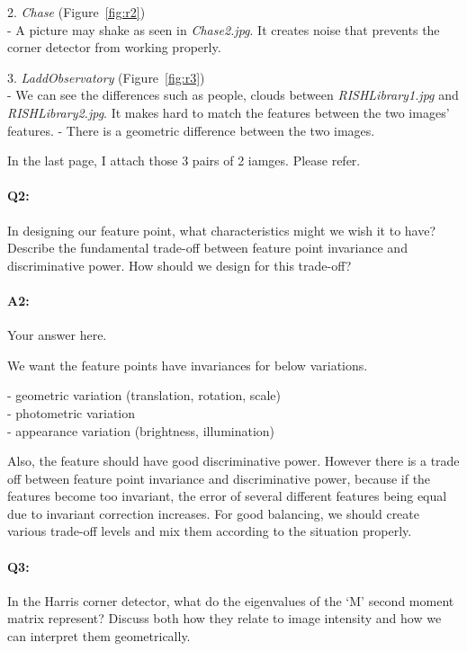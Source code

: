 2. \emph{Chase} (Figure~\ref{fig:r2}) \\
- A picture may shake as seen in \emph{Chase2.jpg}. It creates noise that prevents the corner detector from working properly.


3. \emph{LaddObservatory} (Figure~\ref{fig:r3})\\
- We can see the differences such as people, clouds between \emph{RISHLibrary1.jpg} and \emph{RISHLibrary2.jpg}. It makes hard to match the features between the two images' features.
- There is a geometric difference between the two images.


In the last page, I attach those 3 pairs of 2 iamges. Please refer.


\pagebreak
\paragraph{Q2:} In designing our feature point, what characteristics might we wish it to have? Describe the fundamental trade-off between feature point invariance and discriminative power. How should we design for this trade-off?

\paragraph{A2:} Your answer here.


We want the feature points have invariances for below variations. 


- geometric variation (translation, rotation, scale)\\
- photometric variation\\
- appearance variation (brightness, illumination)


Also, the feature should have good discriminative power. However there is a trade off between feature point invariance and discriminative power, because if the features become too invariant, the error of several different features being equal due to invariant correction increases. For good balancing, we should create various trade-off levels and mix them according to the situation properly.




\pagebreak
\paragraph{Q3:} In the Harris corner detector, what do the eigenvalues of the `M' second moment matrix represent? Discuss both how they relate to image intensity and how we can interpret them geometrically.

